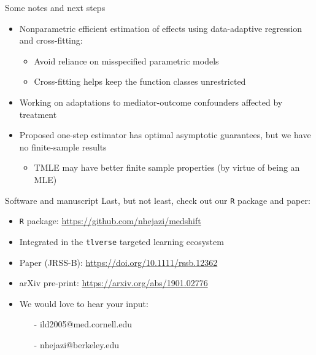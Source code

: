 \documentclass{beamer}
\begin{document}
\begin{frame}{Some notes and next steps}
  \begin{itemize}
  \item Nonparametric efficient estimation of effects using
    data-adaptive regression and cross-fitting:
    \begin{itemize}
    \item Avoid reliance on misspecified parametric models
    \item Cross-fitting helps keep the function classes unrestricted
    \end{itemize}
  \item Working on adaptations to mediator-outcome confounders
    affected by treatment
  \item Proposed one-step estimator has optimal asymptotic guarantees, but we
    have no finite-sample results
    \begin{itemize}
    \item TMLE may have better finite sample properties (by virtue of
      being an MLE)
    \end{itemize}
  \end{itemize}

\note{
}

\end{frame}


\begin{frame}{Software and manuscript}
  Last, but not least, check out our \texttt{R} package and paper:
  \begin{itemize}
  \item \texttt{R} package: \url{https://github.com/nhejazi/medshift}
  \item Integrated in the \texttt{tlverse} targeted learning ecosystem
  \item Paper (JRSS-B): \url{https://doi.org/10.1111/rssb.12362}
  \item arXiv pre-print: \url{https://arxiv.org/abs/1901.02776}
  \item We would love to hear your input:
    \begin{itemize}
    \item[-] ild2005@med.cornell.edu
    \item[-] nhejazi@berkeley.edu
    \end{itemize}
  \end{itemize}

\note{
}

\end{frame}
\end{document}
